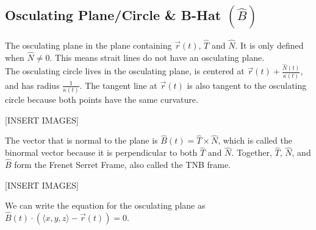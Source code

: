 \subsection{Osculating Plane/Circle \& B-Hat $\left(\hat{B}\right)$}
\noindent
The osculating plane in the plane containing $\vec{r}(t)$, $\hat{T}$ and $\hat{N}$. It is only defined when $\hat{N}\neq 0$. This means strait lines do not have an osculating plane.\\

\noindent
The osculating circle lives in the osculating plane, is centered at $\vec{r}(t) + \frac{\hat{N}(t)}{\kappa(t)}$, and has radius $\frac{1}{\kappa(t)}$. The tangent line at $\vec{r}(t)$ is also tangent to the osculating circle because both points have the same curvature.

[INSERT IMAGES]

\noindent
The vector that is normal to the plane is $\hat{B}(t) = \hat{T}\times\hat{N}$, which is called the binormal vector because it is perpendicular to both $\hat{T}$ and $\hat{N}$. Together, $\hat{T}$, $\hat{N}$, and $\hat{B}$ form the Frenet Serret Frame, also called the TNB frame.

[INSERT IMAGES]

\noindent
We can write the equation for the osculating plane as $\hat{B}(t)\cdot\left(\langle x,y,z\rangle - \vec{r}(t)\right) = 0$.